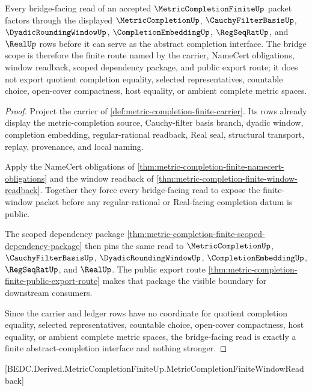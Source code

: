 \begin{theorem}
\label{thm:metric-completion-finite-bridge-scope}
Every bridge-facing read of an accepted $\MetricCompletionFiniteUp$ packet factors through the displayed $\MetricCompletionUp$, $\CauchyFilterBasisUp$, $\DyadicRoundingWindowUp$, $\CompletionEmbeddingUp$, $\RegSeqRatUp$, and $\RealUp$ rows before it can serve as the abstract completion interface. The bridge scope is therefore the finite route named by the carrier, NameCert obligations, window readback, scoped dependency package, and public export route; it does not export quotient completion equality, selected representatives, countable choice, open-cover compactness, host equality, or ambient complete metric spaces.
\end{theorem}
\begin{proof}
Project the carrier of \autoref{def:metric-completion-finite-carrier}. Its rows already display the metric-completion source, Cauchy-filter basis branch, dyadic window, completion embedding, regular-rational readback, Real seal, structural transport, replay, provenance, and local naming.

Apply the NameCert obligations of \autoref{thm:metric-completion-finite-namecert-obligations} and the window readback of \autoref{thm:metric-completion-finite-window-readback}. Together they force every bridge-facing read to expose the finite-window packet before any regular-rational or Real-facing completion datum is public.

The scoped dependency package \autoref{thm:metric-completion-finite-scoped-dependency-package} then pins the same read to $\MetricCompletionUp$, $\CauchyFilterBasisUp$, $\DyadicRoundingWindowUp$, $\CompletionEmbeddingUp$, $\RegSeqRatUp$, and $\RealUp$. The public export route \autoref{thm:metric-completion-finite-public-export-route} makes that package the visible boundary for downstream consumers.

Since the carrier and ledger rows have no coordinate for quotient completion equality, selected representatives, countable choice, open-cover compactness, host equality, or ambient complete metric spaces, the bridge-facing read is exactly a finite abstract-completion interface and nothing stronger.
\end{proof}

[BEDC.Derived.MetricCompletionFiniteUp.MetricCompletionFiniteWindowReadback]

